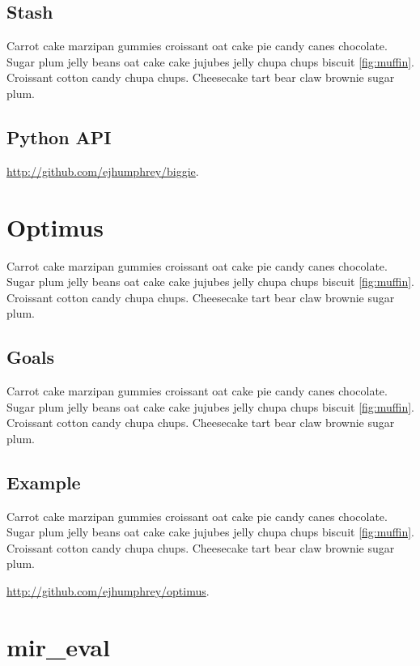 \subsection{Stash}
\label{subsec:stash}

Carrot cake marzipan gummies croissant oat cake pie candy canes chocolate.
Sugar plum jelly beans oat cake cake jujubes jelly chupa chups biscuit \ref{fig:muffin}.
Croissant cotton candy chupa chups.
Cheesecake tart bear claw brownie sugar plum.



\subsection{Python API}
\label{subsec:biggie_tools}

\url{http://github.com/ejhumphrey/biggie}.

\section{Optimus}
\label{sec:optimus}

Carrot cake marzipan gummies croissant oat cake pie candy canes chocolate.
Sugar plum jelly beans oat cake cake jujubes jelly chupa chups biscuit \ref{fig:muffin}.
Croissant cotton candy chupa chups.
Cheesecake tart bear claw brownie sugar plum.

\subsection{Goals}
\label{subsec:goals}

Carrot cake marzipan gummies croissant oat cake pie candy canes chocolate.
Sugar plum jelly beans oat cake cake jujubes jelly chupa chups biscuit \ref{fig:muffin}.
Croissant cotton candy chupa chups.
Cheesecake tart bear claw brownie sugar plum.

\subsection{Example}
\label{subsec:example}

Carrot cake marzipan gummies croissant oat cake pie candy canes chocolate.
Sugar plum jelly beans oat cake cake jujubes jelly chupa chups biscuit \ref{fig:muffin}.
Croissant cotton candy chupa chups.
Cheesecake tart bear claw brownie sugar plum.

\url{http://github.com/ejhumphrey/optimus}.


\section{mir\_eval}
\label{sec:mir_eval}

